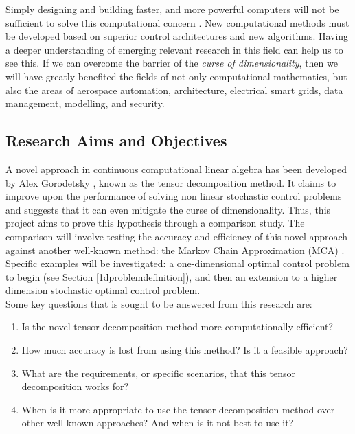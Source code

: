 \documentclass[11pt,draftd]{article}
\begin{document}
\noindent Simply designing and building faster, and more powerful computers will not be sufficient to solve this computational concern \cite{powersystem}. New computational methods must be developed based on superior control architectures and new algorithms. Having a deeper understanding of emerging relevant research in this field can help us to see this. If we can overcome the barrier of the \textit{curse of dimensionality}, then we will have greatly benefited the fields of not only computational mathematics, but also the areas of aerospace automation, architecture, electrical smart grids, data management, modelling, and security.\\

\subsection{Research Aims and Objectives}
A novel approach in continuous computational linear algebra has been developed by Alex Gorodetsky \cite{alex-c3}, known as the tensor decomposition method. It claims to improve upon the performance of solving non linear stochastic control problems and suggests that it can even mitigate the curse of dimensionality. Thus, this project aims to prove this hypothesis through a comparison study. The comparison will involve testing the accuracy and efficiency of this novel approach against another well-known method: the Markov Chain Approximation (MCA) \cite{kushner}. \\

\noindent Specific examples will be investigated: a one-dimensional optimal control problem to begin (see Section \ref{1dproblemdefinition}), and then an extension to a higher dimension stochastic optimal control problem. \\

\noindent Some key questions that is sought to be answered from this research are:
\begin{enumerate}
	\item Is the novel tensor decomposition method more computationally efficient?
	\item How much accuracy is lost from using this method? Is it a feasible approach?
	\item What are the requirements, or specific scenarios, that this tensor decomposition works for?
	\item When is it more appropriate to use the tensor decomposition method over other well-known approaches? And when is it not best to use it?
\end{enumerate}
\newpage
\end{document}
